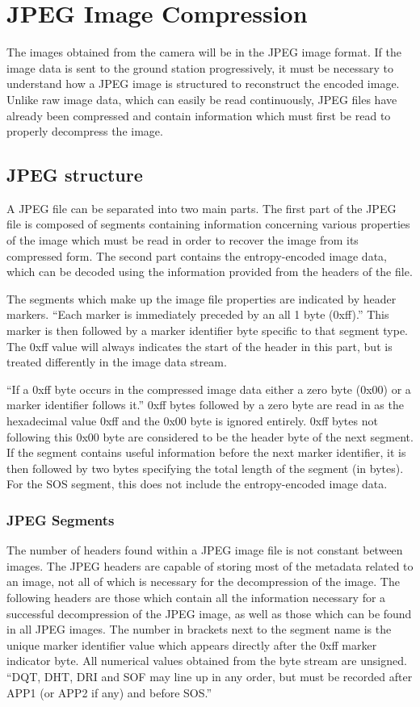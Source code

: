 
\section{JPEG Image Compression}
The images obtained from the camera will be in the JPEG image format. 
If the image data is sent to the ground station progressively, 
it must be necessary to understand how a JPEG image is structured to reconstruct the encoded image. 
Unlike raw image data, which can easily be read continuously, 
JPEG files have already been compressed and contain information which must first be read to properly decompress the image.

\subsection{JPEG structure}
A JPEG file can be separated into two main parts. 
The first part of the JPEG file is composed of segments containing information concerning 
various properties of the image which must be read in order to recover the image from its compressed form. 
The second part contains the entropy-encoded image data, which can be decoded using the information provided from the headers of the file.  

The segments which make up the image file properties are indicated by header markers. 
``Each marker is immediately preceded by an all 1 byte (0xff).'' \cite{jpeg_layout}
This marker is then followed by a marker identifier byte specific to that segment type. 
The 0xff value will always indicates the start of the header in this part, but is treated differently in the image data stream. 

``If a 0xff byte occurs in the compressed image data either a zero byte (0x00) or a marker identifier follows it.'' \cite{jpeg_layout} 
0xff bytes followed by a zero byte are read in as the hexadecimal value 0xff and the 0x00 byte is ignored entirely. 
0xff bytes not following this 0x00 byte are considered to be the header byte of the next segment. 
If the segment contains useful information before the next marker identifier, it is then followed by two bytes specifying the total length of the segment (in bytes). 
For the SOS segment, this does not include the entropy-encoded image data.

\subsubsection{JPEG Segments}
The number of headers found within a JPEG image file is not constant between images. 
The JPEG headers are capable of storing most of the metadata related to an image, not all of which is necessary for the decompression of the image. 
The following headers are those which contain all the information necessary for 
a successful decompression of the JPEG image, as well as those which can be found in all JPEG images. 
The number in brackets next to the segment name is the unique marker identifier value which appears directly after the 0xff marker indicator byte. 
All numerical values obtained from the byte stream are unsigned. 
``DQT, DHT, DRI and SOF may line up in any order, but must be recorded after APP1 (or APP2 if any) and before SOS.'' \cite{exif_std}

